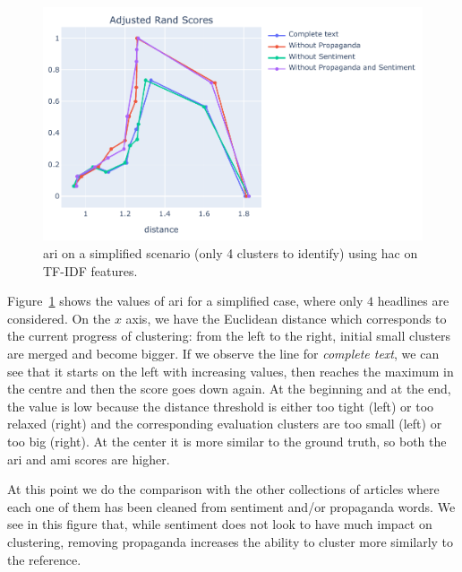 \begin{figure}[!htbp]
    \centering
    \includegraphics[width=\linewidth]{figures/sentpropnoise_4_en_tfidf_fitness_topic-cropped.pdf}
    \caption{\acrshort{ari} on a simplified scenario (only 4 clusters to identify) using \acrshort{hac} on TF-IDF features.}
    \label{fig:hierarchical_sentpropnoise_evolution}
\end{figure}

Figure~\ref{fig:hierarchical_sentpropnoise_evolution} shows the values of \acrshort{ari} for a simplified case, where only $4$ headlines are considered.
On the $x$ axis, we have the Euclidean distance which corresponds to the current progress of clustering: from the left to the right, initial small clusters are merged and become bigger.
If we observe the line for \textit{complete text}, we can see that it starts on the left with increasing values, then reaches the maximum in the centre and then the score goes down again. At the beginning and at the end, the value is low because the distance threshold is either too tight (left) or too relaxed (right) and the corresponding evaluation clusters are too small (left) or too big (right).
At the center it is more similar to the ground truth, so both the \acrshort{ari} and \acrshort{ami}
scores are higher.

At this point we do the comparison with the other collections of articles where each one of them has been cleaned from sentiment and/or propaganda words. We see in this figure that, while sentiment does not look to have much impact on clustering, removing propaganda increases the ability to cluster more similarly to the reference. 

